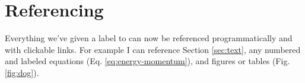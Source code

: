 \documentclass[12pt]{report}
\begin{document}
\section{Referencing}
    Everything we've given a label to can now be referenced programmatically and with clickable links. For example I can reference Section \ref{sec:text}, any numbered and labeled equations (Eq. \ref{eq:energy-momentum}), and figures or tables (Fig. \ref{fig:dog}).
    
    
\end{document}
